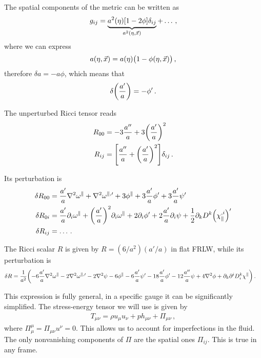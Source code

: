 \documentclass[main.tex]{subfiles}
\begin{document}
The spatial components of the metric can be written as 
%
\begin{align}
g_{ij} = \underbrace{a^2(\eta ) \qty[1 - 2 \phi ] \delta_{ij}}_{a^2(\eta , \vec{x})} + \dots
\,,
\end{align}
%
where we can express 
%
\begin{align}
a(\eta , \vec{x}) = a(\eta ) \qty(1 - \phi (\eta , \vec{x}))
\,,
\end{align}
%
therefore \(\delta a = - a \phi \), which means that 
%
\begin{align}
\delta \qty( \frac{a^{\prime}}{a}) = - \phi '
\,.
\end{align}

The unperturbed Ricci tensor reads 
%
\begin{align}
R_{00} &= - 3 \frac{a''}{a} + 3 \qty( \frac{a'}{a})^2  \\
R_{ij} &=  \qty[\frac{a''}{a} + \qty(\frac{a'}{a})^2] \delta_{ij} 
\,.
\end{align}

Its perturbation is 
%
\begin{align}
\delta R_{00} &= \frac{a'}{a} \nabla^2 \omega^{\parallel} + \nabla^2 \omega^{\parallel, \prime} + 3 \phi^{\parallel} + 3 \frac{a'}{a} \phi' + 3 \frac{a'}{a} \psi '  \\
\delta R_{0i} &= \frac{a'}{a} \partial_{i} \omega^{\parallel} + \qty(\frac{a'}{a})^2 \partial_{i} \omega^{\parallel} +2 \partial_{i} \phi' + 2 \frac{a'}{a} \partial_{i} \psi + \frac{1}{2} \partial_{k} D^{k} \qty(\chi^{, i}_{\parallel})'  \\
\delta R_{ij} &= \dots
\,.
\end{align}


The Ricci scalar \(R\) is given by \(R = (6/a^2) (a' / a)\) in flat FRLW, while its perturbation is 
%
\begin{align}
\delta R &= \frac{1}{a^2} \qty(- 6 \frac{a'}{a} \nabla^2\omega^{\parallel} - 2 \nabla^2 \omega^{\parallel, \prime} - 2 \nabla^2 \psi - 6 \phi^{\parallel} - 6 \frac{a'}{a} \psi' - 18 \frac{a'}{a} \phi ' - 12 \frac{a''}{a} \psi + 4 \nabla^2 \phi + \partial_{k} \partial^{i} D^{k}_{i} \chi^{\parallel})
\,.
\end{align}

This expression is fully general, in a specific gauge it can be significantly simplified.  
The stress-energy tensor we will use is given by 
%
\begin{align}
T_{\mu \nu } = \rho u_\mu u_\nu + p h_{\mu \nu } + \Pi_{\mu \nu }
\,,
\end{align}
%
where \(\Pi^{\mu }_{\mu } = \Pi_{\mu \nu } u^{\nu } = 0\). This allows us to account for imperfections in the fluid. The only nonvanishing components of \(\Pi \) are the spatial ones \(\Pi_{ij}\). 
This is true in any frame. 
\end{document}
